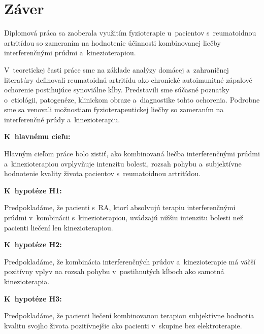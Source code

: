 
\chapter*{Záver}

Diplomová práca sa zaoberala využitím fyzioterapie u~pacientov s~reumatoidnou artritídou so zameraním na hodnotenie účinnosti kombinovanej liečby interferenčnými prúdmi a~kinezioterapiou.

V~teoretickej časti práce sme na základe analýzy domácej a~zahraničnej literatúry definovali reumatoidnú artritídu ako chronické autoimunitné zápalové ochorenie postihujúce synoviálne kĺby. Predstavili sme súčasné poznatky o~etiológii, patogenéze, klinickom obraze a~diagnostike tohto ochorenia. Podrobne sme sa venovali možnostiam fyzioterapeutickej liečby so zameraním na interferenčné prúdy a~kinezioterapiu.


\textbf{K~hlavnému cieľu:}

Hlavným cieľom práce bolo zistiť, ako kombinovaná liečba interferenčnými prúdmi a~kinezioterapiou ovplyvňuje intenzitu bolesti, rozsah pohybu a~subjektívne hodnotenie kvality života pacientov s~reumatoidnou artritídou.


\textbf{K~hypotéze H1:}

Predpokladáme, že pacienti s~RA, ktorí absolvujú terapiu interferenčnými prúdmi v~kombinácii s~kinezioterapiou, uvádzajú nižšiu intenzitu bolesti než pacienti liečení len kinezioterapiou.


\textbf{K~hypotéze H2:}

Predpokladáme, že kombinácia interferenčných prúdov a~kinezioterapie má väčší pozitívny vplyv na rozsah pohybu v~postihnutých kĺboch ako samotná kinezioterapia.


\textbf{K~hypotéze H3:}

Predpokladáme, že pacienti liečení kombinovanou terapiou subjektívne hodnotia kvalitu svojho života pozitívnejšie ako pacienti v~skupine bez elektroterapie.

